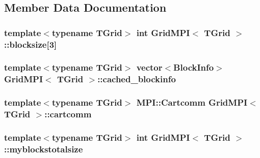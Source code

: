 \subsection{Member Data Documentation}
\hypertarget{class_grid_m_p_i_a9c0c291e8619844c31afa37d884e7805}{}
\subsubsection[{blocksize}]{\setlength{\rightskip}{0pt plus 5cm}template$<$typename T\+Grid$>$ int {\bf Grid\+M\+P\+I}$<$ T\+Grid $>$\+::blocksize\mbox{[}3\mbox{]}\hspace{0.3cm}{\ttfamily [protected]}}\label{class_grid_m_p_i_a9c0c291e8619844c31afa37d884e7805}
\hypertarget{class_grid_m_p_i_ad5256ab6f6cef049008518d5d2ab7bdb}{}
\subsubsection[{cached\+\_\+blockinfo}]{\setlength{\rightskip}{0pt plus 5cm}template$<$typename T\+Grid$>$ vector$<${\bf Block\+Info}$>$ {\bf Grid\+M\+P\+I}$<$ T\+Grid $>$\+::cached\+\_\+blockinfo\hspace{0.3cm}{\ttfamily [protected]}}\label{class_grid_m_p_i_ad5256ab6f6cef049008518d5d2ab7bdb}
\hypertarget{class_grid_m_p_i_a11225861787838aeb43f9a6be7a5736b}{}
\subsubsection[{cartcomm}]{\setlength{\rightskip}{0pt plus 5cm}template$<$typename T\+Grid$>$ M\+P\+I\+::\+Cartcomm {\bf Grid\+M\+P\+I}$<$ T\+Grid $>$\+::cartcomm\hspace{0.3cm}{\ttfamily [protected]}}\label{class_grid_m_p_i_a11225861787838aeb43f9a6be7a5736b}
\hypertarget{class_grid_m_p_i_a33aea82975cdfa2b3f017ee35fab6c5b}{}
\subsubsection[{myblockstotalsize}]{\setlength{\rightskip}{0pt plus 5cm}template$<$typename T\+Grid$>$ int {\bf Grid\+M\+P\+I}$<$ T\+Grid $>$\+::myblockstotalsize\hspace{0.3cm}{\ttfamily [protected]}}\label{class_grid_m_p_i_a33aea82975cdfa2b3f017ee35fab6c5b}
\hypertarget{class_grid_m_p_i_a18238a13a4e9d9448ff9562560d5eadf}{}
